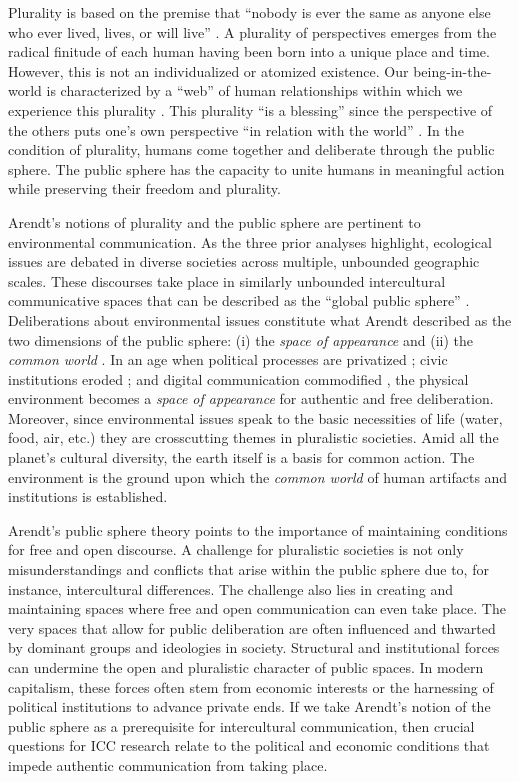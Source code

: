 Plurality is based on the premise that ``nobody is ever the same as anyone else who ever lived, lives, or will live'' \citep[78]{Arendt1958a}. A plurality of perspectives emerges from the radical finitude of each human having been born into a unique place and time. However, this is not an individualized or atomized existence. Our being-in-the-world is characterized by a ``web'' of human relationships within which we experience this plurality \citep[175]{Arendt1958a}. This plurality ``is a blessing'' since the perspective of the others puts one's own perspective ``in relation with the world'' \citep[443]{Gambetti2005}. In the condition of plurality, humans come together and deliberate through the public sphere. The public sphere has the capacity to unite humans in meaningful action while preserving their freedom and plurality. 

Arendt's notions of plurality and the public sphere are pertinent to environmental communication. As the three prior analyses highlight, ecological issues are debated in diverse societies across multiple, unbounded geographic scales. These discourses take place in similarly unbounded intercultural communicative spaces that can be described as the ``global public sphere'' \citep{Volkmer2014}. Deliberations about environmental issues constitute what Arendt described as the two dimensions of the public sphere: (i) the \textit{space of appearance} and (ii) the \textit{common world} \citep{DEntreves2018a}. In an age when political processes are privatized \citep{Wolin2008}; civic institutions eroded \citep[see][]{Putnam1995}; and digital communication commodified \citep{Fuchs2009a}, the physical environment becomes a \textit{space of appearance} for authentic and free deliberation. Moreover, since environmental issues speak to the basic necessities of life (water, food, air, etc.) they are crosscutting themes in pluralistic societies. Amid all the planet's cultural diversity, the earth itself is a basis for common action. The environment is the ground upon which the \textit{common world} of human artifacts and institutions is established.

Arendt's public sphere theory points to the importance of maintaining conditions for free and open discourse. A challenge for pluralistic societies is not only misunderstandings and conflicts that arise within the public sphere due to, for instance, intercultural differences. The challenge also lies in creating and maintaining spaces where free and open communication can even take place. The very spaces that allow for public deliberation are often influenced and thwarted by dominant groups and ideologies in society. Structural and institutional forces can undermine the open and pluralistic character of public spaces. In modern capitalism, these forces often stem from economic interests or the harnessing of political institutions to advance private ends. If we take Arendt's notion of the public sphere as a prerequisite for intercultural communication, then crucial questions for ICC research relate to the political and economic conditions that impede authentic communication from taking place.

